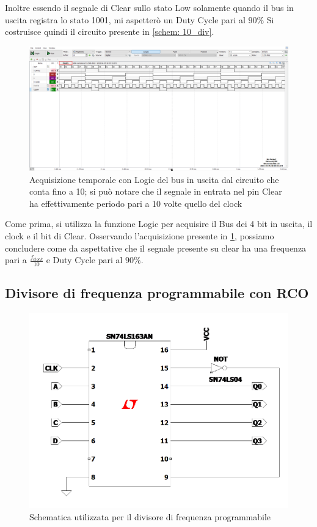 \documentclass[10pt, a4paper, italian]{article}
\begin{document}
Inoltre essendo il segnale di Clear sullo stato Low solamente quando il bus in uscita registra lo stato 1001, mi aspetterò un Duty Cycle pari al $90 \percent$
Si costruisce quindi il circuito presente in \cref{schem: 10_div}.
\begin{figure}[htbp]
\centering
	\includegraphics[width=\textwidth]{5.e}
	\caption{Acquisizione temporale con Logic del bus in uscita dal circuito che conta fino a 10; si può notare che il segnale in entrata nel pin Clear ha effettivamente periodo pari a 10 volte quello del clock \label{fig: Count_10th}}
\end{figure}
Come prima, si utilizza la funzione Logic per acquisire il Bus dei 4 bit in uscita, il clock e il bit di Clear.
Osservando l'acquisizione presente in \cref{fig: Count_10th}, possiamo concludere come da aspettative che il segnale presente su clear ha una frequenza pari a $\frac{f_{clock}}{10}$ e Duty Cycle pari al $90 \percent$.
\subsection{Divisore di frequenza programmabile con RCO}
\begin{figure}[htbp]
\centering
	\includegraphics[width=\textwidth]{Draft2}
	\caption{Schematica utilizzata per il divisore di frequenza programmabile}
\end{figure}
\end{document}
